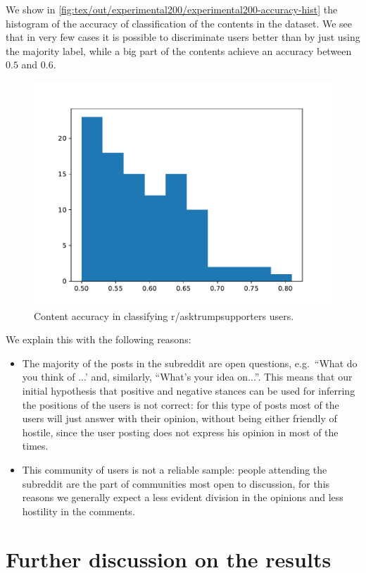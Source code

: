 
We show in \autoref{fig:tex/out/experimental200/experimental200-accuracy-hist}
the histogram of the accuracy of classification of the contents in the dataset.
We see that in very few cases it is possible to discriminate users better than
by just using the majority label, while a big part of the contents achieve an
accuracy between $0.5$ and $0.6$.

\begin{figure}
	\centering
	\includegraphics[width=0.6\linewidth]{tex/out/experimental200/experimental200-accuracy-hist.pdf}
	\caption{Content accuracy in classifying r/asktrumpsupporters users.}%
	\label{fig:tex/out/experimental200/experimental200-accuracy-hist}
\end{figure}

We explain this with the following reasons:
\begin{itemize}
	\item The majority of the posts in the subreddit are open questions, e.g.\ ``What
	      do you think of ...' and, similarly, ``What's your idea on...''. This
	      means that our initial hypothesis that positive and negative
	      stances can be used for inferring the positions of
	      the users is not correct: for this type of posts most of the users
	      will just answer with their opinion, without being either friendly of
	      hostile, since the user posting does not express his opinion
	      in most of the times.
	\item This community of users is not a reliable sample: people attending
	      the subreddit are the part of communities most open to discussion, for this
	      reasons we generally expect a less evident division in the opinions and
	      less hostility in the comments.
\end{itemize}

\section{Further discussion on the results}%
\label{sec:discussion}

